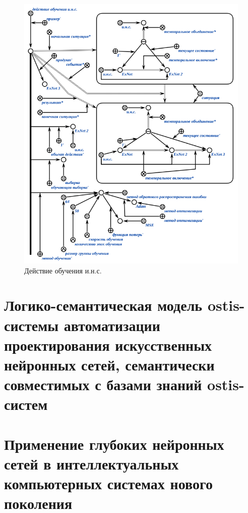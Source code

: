 \begin{figure}[H]
	\includegraphics[scale=0.8]{author/part3/figures/ann_training_nn_scg.png}
	\caption{Действие обучения и.н.с.}
	\label{fig:ann_training_nn_scg}
\end{figure}

\section{Логико-семантическая модель ostis-системы автоматизации проектирования искусственных нейронных сетей, семантически совместимых с базами знаний ostis-систем}
\section{Применение глубоких нейронных сетей в интеллектуальных компьютерных системах нового поколения}

